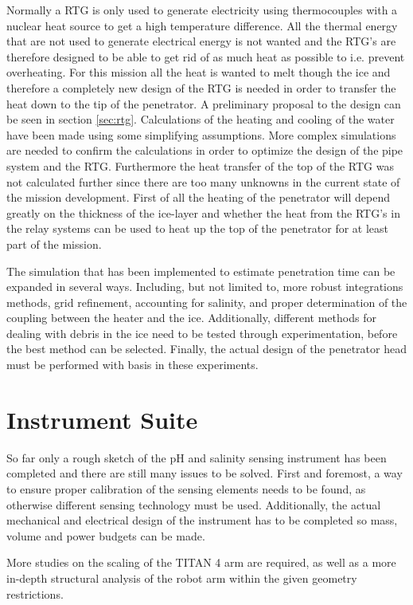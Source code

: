 Normally a RTG is only used to generate electricity using thermocouples with a nuclear heat source to get a high temperature difference. All the thermal energy that are not used to generate electrical energy is not wanted and the RTG's are therefore designed to be able to get rid of as much heat as possible to i.e. prevent overheating. For this mission all the heat is wanted to melt though the ice and therefore a completely new design of the RTG is needed in order to transfer the heat down to the tip of the penetrator. A preliminary proposal to the design can be seen in section \ref{sec:rtg}. Calculations of the heating and cooling of the water have been made using some simplifying assumptions. More complex simulations are needed to confirm the calculations in order to optimize the design of the pipe system and the RTG. Furthermore the heat transfer of the top of the RTG was not calculated further since there are too many unknowns in the current state of the mission development. First of all the heating of the penetrator will depend greatly on the thickness of the ice-layer and whether the heat from the RTG's in the relay systems can be used to heat up the top of the penetrator for at least part of the mission.

The simulation that has been implemented to estimate penetration time can be expanded in several ways. Including, but not limited to, more robust integrations methods, grid refinement, accounting for salinity, and proper determination of the coupling between the heater and the ice. Additionally, different methods for dealing with debris in the ice need to be tested through experimentation, before the best method can be selected. Finally, the actual design of the penetrator head must be performed with basis in these experiments.

\section{Instrument Suite}
	
So far only a rough sketch of the pH and salinity sensing instrument has been completed and there are still many issues to be solved. First and foremost, a way to ensure proper calibration of the sensing elements needs to be found, as otherwise different sensing technology must be used. Additionally, the actual mechanical and electrical design of the instrument has to be completed so mass, volume and power budgets can be made.

More studies on the scaling of the TITAN 4 arm are required, as well as a more in-depth structural analysis of the robot arm within the given geometry restrictions.


